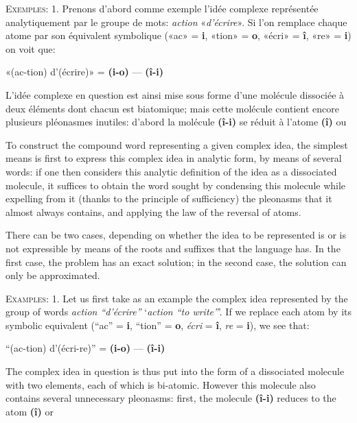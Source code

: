 \begin{sloppypar}
{  \textsc{Exemples}: 1. Prenons d’abord comme exemple l’idée complexe
  représentée analytiquement par le groupe de mots: \emph{action}
  «\emph{d'écrire}». Si l’on remplace chaque atome par son équivalent
  symbolique («ac» = \textbf{i}, «tion» = \textbf{o}, «écri» =
  \textbf{î}, «re» = \textbf{i}) on voit que:

  \begin{center}
    «(ac-tion) d’(écrire)» = \textbf{(i-o)} — \textbf{(î-i)}
  \end{center}


  L’idée complexe en question est ainsi mise sous forme d’une molécule
  dissociée à deux éléments dont chacun est biatomique; mais cette
  molécule contient encore plusieurs pléonasmes inutiles: d’abord la
  molécule \textbf{(î-i)} se réduit à l’atome \textbf{(î)} ou

}
%
{To construct the compound word representing a given complex idea, the
  simplest means is first to express this complex idea in analytic
  form, by means of several words: if one then considers this analytic
  definition of the idea as a dissociated molecule, it suffices to
  obtain the word sought by condensing this molecule while expelling
  from it (thanks to the principle of sufficiency) the pleonasms that
  it almost always contains, and applying the law of the reversal of
  atoms.

  There can be two cases, depending on whether the idea to be
  represented is or is not expressible by means of the roots and
  suffixes that the language has. In the first case, the problem has
  an exact solution; in the second case, the solution can only be
  approximated.

  \textsc{Examples}: 1. Let us first take as an example the complex
  idea represented by the group of words \emph{action ``d'écrire''}
  `\emph{action ``to write''}'. If we replace each atom by its
  symbolic equivalent (``ac'' = \textbf{i}, ``tion'' = \textbf{o},
  \emph{écri} = \textbf{î}, \emph{re} = \textbf{i}), we see that:
  
  \begin{center}
    ``(ac-tion) d’(écri-re)'' = \textbf{(i-o)} — \textbf{(î-i)}
  \end{center}

  The complex idea in question is thus put into the form of a
  dissociated molecule with two elements, each of which is
  bi-atomic. However this molecule also contains several unnecessary
  pleonasms: first, the molecule \textbf{(î-i)} reduces to the atom
  \textbf{(î)} or

}
\end{sloppypar}
